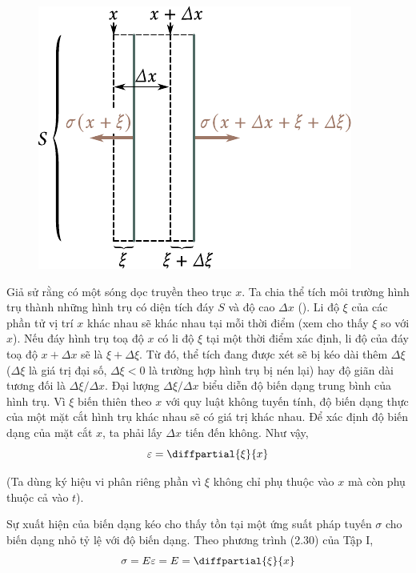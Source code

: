 \begin{figure}[!htb]
	\begin{center}
		\includegraphics[scale=1]{figures/ch_14/fig_14_6.pdf}
		\caption[]{}
		\label{fig:14_6}
	\end{center}
	\vspace{-0.8cm}
\end{figure}

Giả sử rằng có một sóng dọc truyền theo trục $x$. Ta chia thể tích môi trường hình trụ thành những hình trụ có diện tích đáy $S$ và độ cao $\Delta{x}$ (). Li độ $\xi$ của các phần tử vị trí $x$ khác nhau sẽ khác nhau tại mỗi thời điểm (xem  cho thấy $\xi$ so với $x$). Nếu đáy hình trụ toạ độ $x$ có li độ $\xi$ tại một thời điểm xác định, li độ của đáy toạ độ $x+\Delta{x}$ sẽ là $\xi+\Delta{\xi}$. Từ đó, thể tích đang được xét sẽ bị kéo dài thêm $\Delta{\xi}$ ($\Delta{\xi}$ là giá trị đại số, $\Delta{\xi}<0$ là trường hợp hình trụ bị nén lại) hay độ giãn dài tương đối là $\Delta{\xi}/\Delta{x}$. Đại lượng $\Delta{\xi}/\Delta{x}$ biểu diễn độ biến dạng trung bình của hình trụ. Vì $\xi$ biến thiên theo $x$ với quy luật không tuyến tính, độ biến dạng thực của một mặt cắt hình trụ khác nhau sẽ có giá trị khác nhau. Để xác định độ biến dạng của mặt cắt $x$, ta phải lấy $\Delta{x}$ tiến đến không. Như vậy,
\begin{equation}\label{eq:14_30}
	\varepsilon = \diffpartial{\xi}{x}
\end{equation}

\noindent
(Ta dùng ký hiệu vi phân riêng phần vì $\xi$ không chỉ phụ thuộc vào $x$ mà còn phụ thuộc cả vào $t$).

Sự xuất hiện của biến dạng kéo cho thấy tồn tại một ứng suất pháp tuyến $\sigma$ cho biến dạng nhỏ tỷ lệ với độ biến dạng. Theo phương trình (2.30) của Tập I,
\begin{equation}\label{eq:14_31}
	\sigma = E \varepsilon = E = \diffpartial{\xi}{x}
\end{equation}

